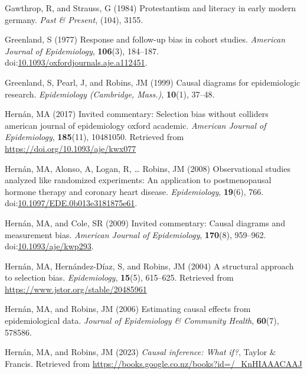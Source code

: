 \documentclass[
  singlecolumn]{article}
\newlength{\cslhangindent}
\newenvironment{CSLReferences}[2] %
 {\begin{list}{}{%
  \setlength{\itemindent}{0pt}
  \setlength{\leftmargin}{0pt}
  \setlength{\parsep}{0pt}
  \ifodd #1
   \setlength{\leftmargin}{\cslhangindent}
   \setlength{\itemindent}{-1\cslhangindent}
  \fi
  \setlength{\itemsep}{#2\baselineskip}}}
 {\end{list}}
\begin{document}
\begin{CSLReferences}{1}{0}
Gawthrop, R, and Strauss, G (1984) Protestantism and literacy in early
modern germany. \emph{Past \& Present}, (104), 3155.

Greenland, S (1977) Response and follow-up bias in cohort studies.
\emph{American Journal of Epidemiology}, \textbf{106}(3), 184--187.
doi:\href{https://doi.org/10.1093/oxfordjournals.aje.a112451}{10.1093/oxfordjournals.aje.a112451}.

Greenland, S, Pearl, J, and Robins, JM (1999) Causal diagrams for
epidemiologic research. \emph{Epidemiology (Cambridge, Mass.)},
\textbf{10}(1), 37--48.

Hernán, MA (2017) Invited commentary: Selection bias without colliders
\textbar{} american journal of epidemiology \textbar{} oxford academic.
\emph{American Journal of Epidemiology}, \textbf{185}(11), 10481050.
Retrieved from \url{https://doi.org/10.1093/aje/kwx077}

Hernán, MA, Alonso, A, Logan, R, \ldots{} Robins, JM (2008)
Observational studies analyzed like randomized experiments: An
application to postmenopausal hormone therapy and coronary heart
disease. \emph{Epidemiology}, \textbf{19}(6), 766.
doi:\href{https://doi.org/10.1097/EDE.0b013e3181875e61}{10.1097/EDE.0b013e3181875e61}.

Hernán, MA, and Cole, SR (2009) Invited commentary: Causal diagrams and
measurement bias. \emph{American Journal of Epidemiology},
\textbf{170}(8), 959--962.
doi:\href{https://doi.org/10.1093/aje/kwp293}{10.1093/aje/kwp293}.

Hernán, MA, Hernández-Díaz, S, and Robins, JM (2004) A structural
approach to selection bias. \emph{Epidemiology}, \textbf{15}(5),
615--625. Retrieved from \url{https://www.jstor.org/stable/20485961}

Hernán, MA, and Robins, JM (2006) Estimating causal effects from
epidemiological data. \emph{Journal of Epidemiology \& Community
Health}, \textbf{60}(7), 578586.

Hernán, MA, and Robins, JM (2023) \emph{Causal inference: What if?},
Taylor \& Francis. Retrieved from
\url{https://books.google.co.nz/books?id=/_KnHIAAACAAJ}


\end{CSLReferences}
\end{document}
